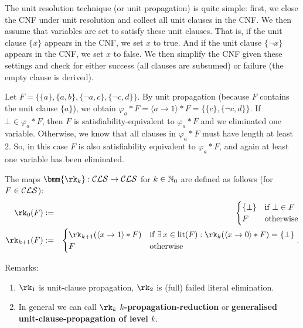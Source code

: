 \documentclass[12pt]{book}
\begin{document}
The unit resolution technique (or unit propagation) is quite simple: first, we close the CNF under unit resolution and collect all unit 
clauses in the CNF. We then assume that variables are set to satisfy these unit clauses. That is, if the unit clause $\{x\}$ appears 
in the CNF, we set $x$ to true. And if the unit clause $\{\neg x\}$ appears in the CNF, we set $x$ to false. We then simplify the 
CNF given these settings and check for either success (all clauses are subsumed) or failure (the empty clause is derived)\cite{h6}.

\begin{examp}\label{exp:unit1}
      Let $F=\{ \{a\}, \{a, b\}, \{\neg a, c\}, \{\neg c, d\}\}$. By unit propagation (because $F$ contains the unit clause $\{a\}$), 
	  we obtain $\varphi_a * F=\langle a \rightarrow 1 \rangle * F= \{ \{c\}, \{\neg c, d\}\}$. If $\bot \in \varphi_a * F$, then $F$ is 
	  satisfiability-equivalent to $\varphi_a * F$ and we eliminated one variable. Otherwise, we know that all clauses in $\varphi_a * F$ 
	  must have length at least 2. So, in this case $F$ is also satisfiability equivalent to $\varphi_a * F$, and again at least one 
	  variable has been eliminated.
\end{examp}

\begin{defi}\label{def:rk}
  The maps $\bmm{\rk_k}: \Cls \ra \Cls$ for $k \in \mathbb{N}_0$ are defined as follows (for $F \in \mathcal{CLS}$):
  \begin{eqnarray*}
    \rk_0(F) & := &
    \begin{cases}
      \set{\bot} & \text{if } \bot \in F\\
      F & \text{otherwise}
    \end{cases}\\
    \rk_{k+1}(F) & := &
    \begin{cases}
      \rk_{k+1}(\pao x1 * F) & \text{if } \ex\, x \in \lit(F) : \rk_k(\pao x0 * F) = \set{\bot}\\
      F & \text{otherwise}
    \end{cases}.
  \end{eqnarray*}
\end{defi}
Remarks:
\begin{enumerate}
\item $\rk_1$ is unit-clause propagation, $\rk_2$ is (full) failed literal elimination.
\item In general we can call $\rk_k$ \textbf{$k$-propagation-reduction} or \textbf{generalised unit-clause-propagation of level $k$}.
\end{enumerate}
\end{document}
